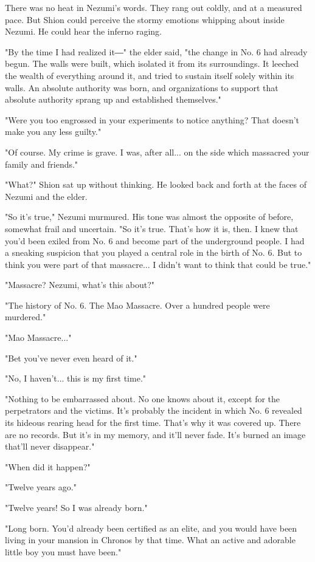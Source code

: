 There was no heat in Nezumi's words. They rang out coldly, and at a
measured pace. But Shion could perceive the stormy emotions whipping
about inside Nezumi. He could hear the inferno raging.

"By the time I had realized it―" the elder said, "the change in No. 6
had already begun. The walls were built, which isolated it from its
surroundings. It leeched the wealth of everything around it, and tried
to sustain itself solely within its walls. An absolute authority was
born, and organizations to support that absolute authority sprang up and
established themselves."

"Were you too engrossed in your experiments to notice anything? That
doesn't make you any less guilty."

"Of course. My crime is grave. I was, after all... on the side which
massacred your family and friends."

"What?" Shion sat up without thinking. He looked back and forth at the
faces of Nezumi and the elder.

"So it's true," Nezumi murmured. His tone was almost the opposite of
before, somewhat frail and uncertain. "So it's true. That's how it is,
then. I knew that you'd been exiled from No. 6 and become part of the
underground people. I had a sneaking suspicion that you played a central
role in the birth of No. 6. But to think you were part of that
massacre... I didn't want to think that could be true."

"Massacre? Nezumi, what's this about?"

"The history of No. 6. The Mao Massacre. Over a hundred people were
murdered."

"Mao Massacre..."

"Bet you've never even heard of it."

"No, I haven't... this is my first time."

"Nothing to be embarrassed about. No one knows about it, except for the
perpetrators and the victims. It's probably the incident in which No. 6
revealed its hideous rearing head for the first time. That's why it was
covered up. There are no records. But it's in my memory, and it'll never
fade. It's burned an image that'll never disappear."

"When did it happen?"

"Twelve years ago."

"Twelve years! So I was already born."

"Long born. You'd already been certified as an elite, and you would have
been living in your mansion in Chronos by that time. What an active and
adorable little boy you must have been."

